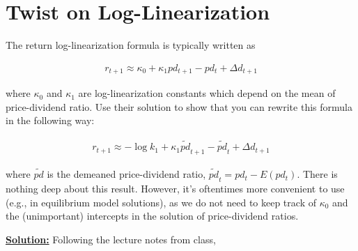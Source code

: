 \documentclass{article}
\begin{document}
\pagebreak

\section{Twist on Log-Linearization}

The return log-linearization formula is typically written as

\begin{align}
r_{t+1} \approx \kappa_0 + \kappa_1 pd_{t+1} - pd_t + \Delta d_{t+1} \label{p3_ll1}
\end{align}

where $\kappa_0$ and $\kappa_1$ are log-linearization constants which depend on the mean of price-dividend ratio. Use their solution to show that you can rewrite this formula in the following way:

\begin{align}
r_{t+1} \approx - \log k_1 + \kappa_1 \tilde{pd}_{t+1} - \tilde{pd}_t + \Delta d_{t+1} \label{p3_ll2}
\end{align}

where $\tilde{pd}$ is the demeaned price-dividend ratio, $\tilde{pd}_t = pd_t - E(pd_t)$.  There is nothing deep about this result. However, it's oftentimes more convenient to use (e.g., in equilibrium model solutions), as we do not need to keep track of $\kappa_0$ and the (unimportant) intercepts in the solution of price-dividend ratios.

\bigskip

\textbf{\underline{Solution:}} Following the lecture notes from class,
\end{document}
